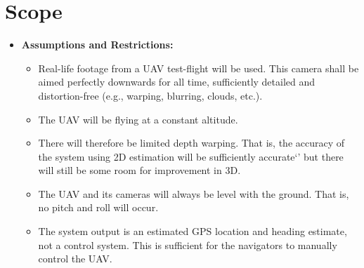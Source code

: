 \section{Scope}
\begin{itemize}
    \item \textbf{Assumptions and Restrictions:}
    \begin{itemize}
        \item Real-life footage from a UAV test-flight will be used. This camera shall be aimed perfectly downwards for all time, sufficiently detailed and distortion-free (e.g., warping, blurring, clouds, etc.).
        \item The UAV will be flying at a constant altitude. 
        \item There will therefore be limited depth warping. That is, the accuracy of the system using 2D estimation will be sufficiently accurate`' but there will still be some room for improvement in 3D.
        \item The UAV and its cameras will always be level with the ground. That is, no pitch and roll will occur. 
        \item The system output is an estimated GPS location and heading estimate, not a control system. This is sufficient for the navigators to manually control the UAV.
    \end{itemize}
\end{itemize}

